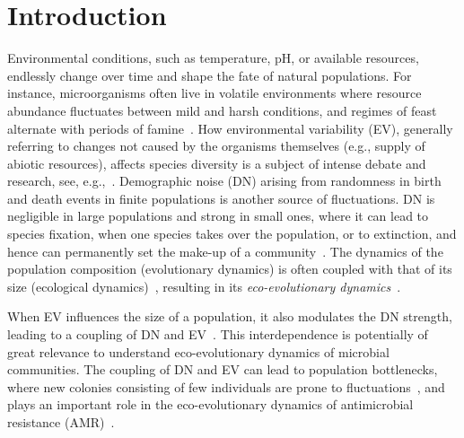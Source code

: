 \documentclass{article}
\begin{document}
\section{Introduction}
Environmental conditions, such as  temperature, pH, or available resources, endlessly change over time and shape the fate of natural populations. For instance, microorganisms often live in volatile environments where resource abundance fluctuates  between mild and harsh conditions, and  regimes of feast alternate with periods of famine~\cite{Srinivasan98,Merritt18,Himeoka19}. How environmental variability (EV), generally referring to changes  not caused by the organisms themselves (e.g., supply of abiotic resources), affects species diversity is a subject of intense debate and research, see, e.g.,~\cite{Grime73,Miller11,Fox13,Chesson81,Chesson94,Chesson00,Ellner19,Murugan21,visco2010switching,gaal2010exact}. Demographic noise (DN) arising from randomness in birth and death events in finite populations is another source of fluctuations. DN is negligible in large populations and strong in small ones, where it can lead to species fixation, when one species takes over the population, or to extinction, and hence can permanently set the make-up of a community~\cite{Ewens,Kimura,Blythe07,Plotkin23}. The dynamics of the population composition (evolutionary dynamics) is often coupled with that of its size (ecological dynamics)~\cite{Roughgarden79}, resulting in its \emph{eco-evolutionary dynamics}~\cite{Pelletier09,Harrington14,wienand2018eco}.

When EV influences the size of a population, it also modulates the DN strength, leading to a coupling of DN and EV~\cite{wienand2017evolution,wienand2018eco,west2020,taitelbaum2020population,Shibasaki2021,taitelbaum2023evolutionary}. This interdependence is potentially of great relevance to understand eco-evolutionary dynamics of microbial communities. The coupling of DN and EV can lead to population bottlenecks, where new colonies consisting of few individuals are prone to fluctuations~\cite{Wahl02,Patwas09,Brockhurst07,Brockhurst07b}, and plays an important role in the eco-evolutionary dynamics of antimicrobial resistance (AMR)~\cite{Coates18,marrec2020resist}. 
\end{document}
